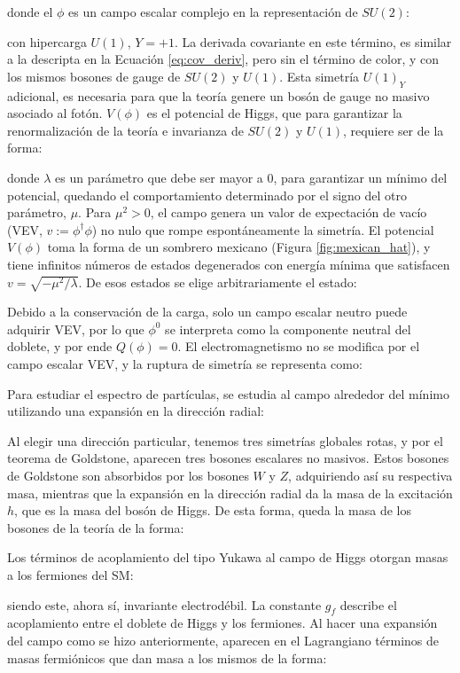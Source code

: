donde el $\phi$ es un campo escalar complejo en la representación de $SU(2)$:



con hipercarga $U(1)$, $Y=+1$. La derivada covariante en este término, es similar a la descripta en la Ecuación \ref{eq:cov_deriv}, pero sin el término de color, y con los mismos bosones de gauge de $SU(2)$ y $U(1)$. Esta simetría $U(1)_Y$ adicional, es necesaria para que la teoría genere un bosón de gauge no masivo asociado al fotón.
$V(\phi)$ es el potencial de Higgs, que para garantizar la renormalización de la teoría e invarianza de $SU(2)$ y $U(1)$, requiere ser de la forma:


donde $\lambda$ es un parámetro que debe ser mayor a $0$, para garantizar un mínimo del potencial, quedando el comportamiento determinado por el signo del otro parámetro, $\mu$. Para $\mu^2>0$, el campo genera un valor de expectación de vacío (VEV, $v:=\phi^{\dagger}\phi$) no nulo que rompe espontáneamente la simetría. El potencial $V(\phi)$ toma la forma de un sombrero mexicano (Figura \ref{fig:mexican_hat}), y tiene infinitos números de estados degenerados con energía mínima que satisfacen $v = \sqrt{-\mu^2/\lambda}$. De esos estados se elige arbitrariamente el estado:



Debido a la conservación de la carga, solo un campo escalar neutro puede adquirir VEV, por lo que $\phi^0$ se interpreta como la componente neutral del doblete, 
y por ende $Q(\phi)=0$. El electromagnetismo no se modifica por el campo escalar VEV, y la ruptura de simetría se representa como:


Para estudiar el espectro de partículas, se estudia al campo alrededor del mínimo utilizando una expansión en la dirección radial:

Al elegir una dirección particular, tenemos tres simetrías globales rotas, y por el teorema de Goldstone, aparecen tres bosones escalares no masivos. Estos bosones de Goldstone son absorbidos por los bosones $W$ y $Z$, adquiriendo así su respectiva masa, 
mientras que la expansión en la dirección radial da la masa de la excitación $h$, que es la masa del bosón de Higgs. De esta forma, queda la masa de los bosones de la teoría de la forma:


Los términos de acoplamiento del tipo Yukawa al campo de Higgs otorgan masas a los fermiones del SM:




siendo este, ahora sí, invariante electrodébil. 
La constante $g_f$ describe el acoplamiento entre el doblete de Higgs y los fermiones. Al hacer una expansión del campo como se hizo anteriormente, aparecen en el Lagrangiano términos de masas fermiónicos que dan masa a los mismos de la forma:



